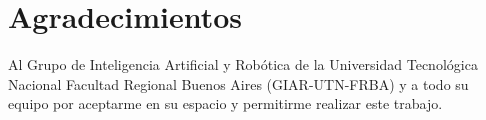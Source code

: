 \chapter*{Agradecimientos}

\noindent Al Grupo de Inteligencia Artificial y Robótica de la Universidad Tecnológica Nacional Facultad Regional Buenos Aires (GIAR-UTN-FRBA) y a todo su equipo por aceptarme en su espacio y permitirme realizar este trabajo. 
